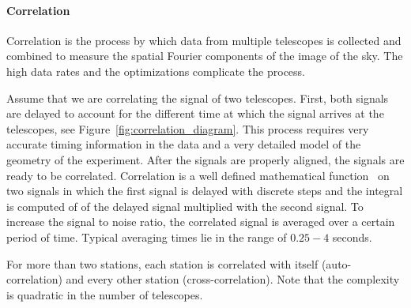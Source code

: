 \paragraph{Correlation}
Correlation is the process by which data from multiple telescopes is
collected and combined to measure the spatial Fourier components of
the image of the sky. The high data rates and the optimizations
complicate the process.

Assume that we are correlating the signal of two telescopes. First,
both signals are delayed to account for the different time at which
the signal arrives at the telescopes, see
Figure~\ref{fig:correlation_diagram}.  This process requires very
accurate timing information in the data and a very detailed model of
the geometry of the experiment. After the signals are properly
aligned, the signals are ready to be correlated. Correlation is a well
defined mathematical function~\cite{def_correlation} on two signals in
which the first signal is delayed with discrete steps and the integral
is computed of of the delayed signal multiplied with the second
signal. To increase the signal to noise ratio, the correlated signal
is averaged over a certain period of time. Typical averaging times lie
in the range of $0.25-4$ seconds.

For more than two stations, each station is correlated with itself
(auto-correlation) and every other station (cross-correlation). Note
that the complexity is quadratic in the number of telescopes.


